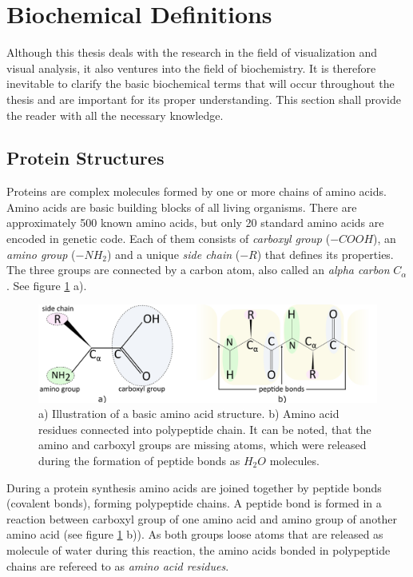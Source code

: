\section{Biochemical Definitions}
\label{Sec:Chem}
Although this thesis deals with the research in the field of visualization and visual analysis, it also ventures into the field of biochemistry. It is therefore inevitable to clarify the basic biochemical terms that will occur throughout the thesis and are important for its proper understanding. This section shall provide the reader with all the necessary knowledge.

\subsection{Protein Structures}
Proteins are complex molecules formed by one or more chains of amino acids. Amino acids are basic building blocks of all living organisms. There are approximately 500 known amino acids, but only 20 standard amino acids are encoded in genetic code. Each of them consists of \textit{carboxyl group} ($-COOH$), an \textit{amino group} ($-NH_2$) and a unique \textit{side chain} ($-R$) that defines its properties. The three groups are connected by a carbon atom, also called an \textit{alpha carbon} $C_\alpha$. See figure \ref{Fig:aa} a).

\begin{figure}[H]
  \centering
  \includegraphics[width=\textwidth]{pictures/aminoacid.pdf} 
  \caption{a) Illustration of a basic amino acid structure. b) Amino acid residues connected into polypeptide chain. It can be noted, that the amino and carboxyl groups are missing atoms, which were released during the formation of peptide bonds as $H_2O$ molecules.}
  \label{Fig:aa}
\end{figure}

During a protein synthesis amino acids are joined together by peptide bonds (covalent bonds), forming polypeptide chains. A peptide bond is formed in a reaction between carboxyl group of one amino acid and amino group of another amino acid (see figure \ref{Fig:aa} b)). As both groups loose atoms that are released as molecule of water during this reaction, the amino acids bonded in polypeptide chains are refereed to as \textit{amino acid residues}. 

